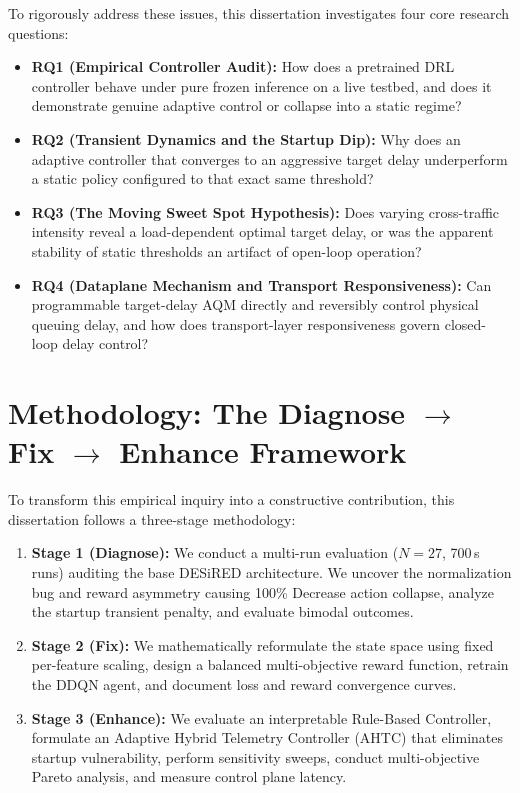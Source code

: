 \documentclass[12pt,a4paper,oneside]{report}
\begin{document}
To rigorously address these issues, this dissertation investigates four core research questions:
\begin{itemize}
  \item \textbf{RQ1 (Empirical Controller Audit):} How does a pretrained DRL controller behave under pure frozen inference on a live testbed, and does it demonstrate genuine adaptive control or collapse into a static regime?
  \item \textbf{RQ2 (Transient Dynamics and the Startup Dip):} Why does an adaptive controller that converges to an aggressive target delay underperform a static policy configured to that exact same threshold?
  \item \textbf{RQ3 (The Moving Sweet Spot Hypothesis):} Does varying cross-traffic intensity reveal a load-dependent optimal target delay, or was the apparent stability of static thresholds an artifact of open-loop operation?
  \item \textbf{RQ4 (Dataplane Mechanism and Transport Responsiveness):} Can programmable target-delay AQM directly and reversibly control physical queuing delay, and how does transport-layer responsiveness govern closed-loop delay control?
\end{itemize}

\section{Methodology: The Diagnose $\to$ Fix $\to$ Enhance Framework}
To transform this empirical inquiry into a constructive contribution, this dissertation follows a three-stage methodology:
\begin{enumerate}[label=\arabic*.]
  \item \textbf{Stage 1 (Diagnose):} We conduct a multi-run evaluation ($N=27$, 700\,s runs) auditing the base DESiRED architecture. We uncover the normalization bug and reward asymmetry causing 100\% Decrease action collapse, analyze the startup transient penalty, and evaluate bimodal outcomes.
  \item \textbf{Stage 2 (Fix):} We mathematically reformulate the state space using fixed per-feature scaling, design a balanced multi-objective reward function, retrain the DDQN agent, and document loss and reward convergence curves.
  \item \textbf{Stage 3 (Enhance):} We evaluate an interpretable Rule-Based Controller, formulate an Adaptive Hybrid Telemetry Controller (AHTC) that eliminates startup vulnerability, perform sensitivity sweeps, conduct multi-objective Pareto analysis, and measure control plane latency.
\end{enumerate}
\end{document}
